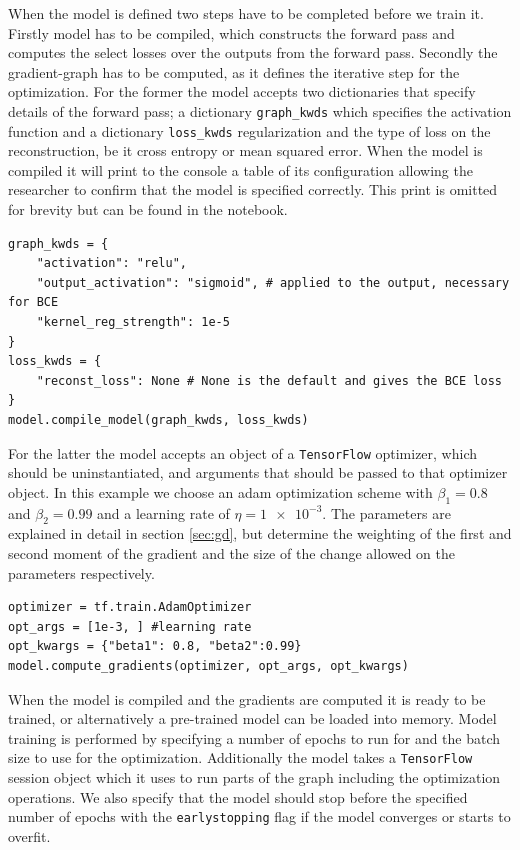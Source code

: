 \noindent When the model is defined two steps have to be completed before we train it. Firstly model has to be compiled, which constructs the forward pass and computes the select losses over the outputs from the forward pass. Secondly the gradient-graph has to be computed, as it defines the iterative step for the optimization. For the former the model accepts two dictionaries that specify details of the forward pass; a dictionary \lstinline{graph_kwds} which specifies the activation function and a dictionary \lstinline{loss_kwds} regularization and the type of loss on the reconstruction, be it cross entropy or mean squared error. When the model is compiled it will print to the console a table of its configuration allowing the researcher to confirm that the model is specified correctly. This print is omitted for brevity but can be found in the notebook.


\begin{minipage}{\linewidth}
\begin{lstlisting}[language=iPython]
graph_kwds = {
    "activation": "relu",
    "output_activation": "sigmoid", # applied to the output, necessary for BCE
    "kernel_reg_strength": 1e-5
}
loss_kwds = {
    "reconst_loss": None # None is the default and gives the BCE loss 
}
model.compile_model(graph_kwds, loss_kwds)
\end{lstlisting}
\end{minipage}


\noindent For the latter the model accepts an object of a \lstinline{TensorFlow} optimizer, which should be uninstantiated, and arguments that should be passed to that optimizer object. In this example we choose an adam optimization scheme with $\beta_1 = 0.8$ and $\beta_2=0.99$ and a learning rate of $\eta=\num{1e-3}$. The parameters are explained in detail in section \ref{sec:gd}, but determine the weighting of the first and second moment of the gradient and the size of the change allowed on the parameters respectively. 

\begin{minipage}{\linewidth}
\begin{lstlisting}[language=iPython]
optimizer = tf.train.AdamOptimizer
opt_args = [1e-3, ] #learning rate
opt_kwargs = {"beta1": 0.8, "beta2":0.99}
model.compute_gradients(optimizer, opt_args, opt_kwargs)
\end{lstlisting}
\end{minipage}

\noindent When the model is compiled and the gradients are computed it is ready to be trained, or alternatively a pre-trained model can be loaded into memory. Model training is performed by specifying a number of epochs to run for and the batch size to use for the optimization. Additionally the model takes a \lstinline{TensorFlow} session object which it uses to run parts of the graph including the optimization operations. We also specify that the model should stop before the specified number of epochs with the \lstinline{earlystopping} flag if the model converges or starts to overfit.

